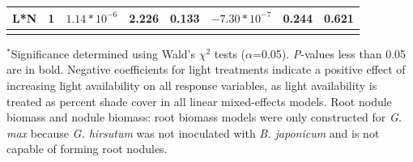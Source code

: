 \begin{landscape}
\begin{table}
\begin{tabular}{p{2.4cm}p{0.5cm}p{2cm}p{1.5cm}p{1.5cm}p{2cm}p{1.5cm}p{1.5cm}}
        L*N & \multicolumn{1}{r}{1}
        &  \multicolumn{1}{r}{$1.14*10^{-6}$}     &   \multicolumn{1}{r}{2.226}           & \multicolumn{1}{r}{0.133}
        & \multicolumn{1}{r}{$-7.30*10^{-7}$}     &   \multicolumn{1}{r}{0.244}           & \multicolumn{1}{r}{0.621}
        \\
        \hline
        \\
    \end{tabular}%
    \label{tab:table2.2}
\end{table}
\begin{singlespace}
    \noindent $^*$Significance determined using Wald’s $\chi^{2}$ tests ($\alpha$=0.05). \textit{P}-values less than 0.05 are in bold. Negative coefficients for light treatments indicate a positive effect of increasing light availability on all response variables, as light availability is treated as percent shade cover in all linear mixed-effects models. Root nodule biomass and nodule biomass: root biomass models were only constructed for \textit{G. max} because \textit{G. hirsutum} was not inoculated with \textit{B. japonicum} and is not capable of forming root nodules.
\end{singlespace}
\end{landscape}
\clearpage

